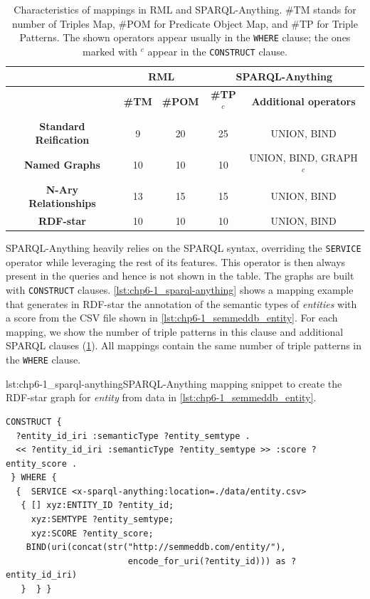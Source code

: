 \begin{table}[t!]
    \caption{Characteristics of mappings in RML and SPARQL-Anything. \#TM stands for number of Triples Map, \#POM for Predicate Object Map, and \#TP for Triple Patterns. The shown operators appear usually in the \texttt{WHERE} clause; the ones marked with $^c$ appear in the \texttt{CONSTRUCT} clause. }
    \label{tab:chp6-1_mapping-char}
    \centering
    \begin{tabular}{ccc|cc}
        \cmidrule{2-5}
         & \multicolumn{2}{c|}{\textbf{RML}} & \multicolumn{2}{c}{\textbf{SPARQL-Anything}}  \\ \midrule
         & \textbf{\#TM} & \textbf{\#POM} & \textbf{\#TP$^c$} & \textbf{Additional operators}  \\ \midrule
         \textbf{Standard Reification} & 9 & 20 & 25 & UNION, BIND  \\ \midrule
         \textbf{Named Graphs} & 10 & 10 & 10 & UNION, BIND, GRAPH$^c$  \\ \midrule
         \textbf{N-Ary Relationships} & 13 & 15 & 15 & UNION, BIND  \\ \midrule
         \textbf{RDF-star} & 10 & 10 & 10 & UNION, BIND  \\  \midrule
         
    \end{tabular}
\end{table}

SPARQL-Anything heavily relies on the SPARQL syntax, overriding the \texttt{SERVICE} operator while leveraging the rest of its features. This operator is then always present in the queries and hence is not shown in the table. The graphs are built with \texttt{CONSTRUCT} clauses. \cref{lst:chp6-1_sparql-anything} shows a mapping example that generates in RDF-star the annotation of the semantic types of \textit{entities} with a score from the CSV file shown in \cref{lst:chp6-1_semmeddb_entity}.
For each mapping, we show the number of triple patterns in this clause and additional SPARQL clauses (\cref{tab:chp6-1_mapping-char}). All mappings contain the same number of triple patterns in the \texttt{WHERE} clause.




\noindent\begin{captionedlisting}{lst:chp6-1_sparql-anything}{SPARQL-Anything mapping snippet to create the RDF-star graph for \textit{entity} from data in \cref{lst:chp6-1_semmeddb_entity}.  }
\centering
{
\begin{lstlisting}[basicstyle=\ttfamily\small,label={list:example1},columns=flexible,language=sparql]
CONSTRUCT {
  ?entity_id_iri :semanticType ?entity_semtype .
  << ?entity_id_iri :semanticType ?entity_semtype >> :score ?entity_score .
 } WHERE {
  {  SERVICE <x-sparql-anything:location=./data/entity.csv>
   { [] xyz:ENTITY_ID ?entity_id;
     xyz:SEMTYPE ?entity_semtype;
     xyz:SCORE ?entity_score;
    BIND(uri(concat(str("http://semmeddb.com/entity/"),
                        encode_for_uri(?entity_id))) as ?entity_id_iri)
   }  } }

\end{lstlisting}
}
\end{captionedlisting}



